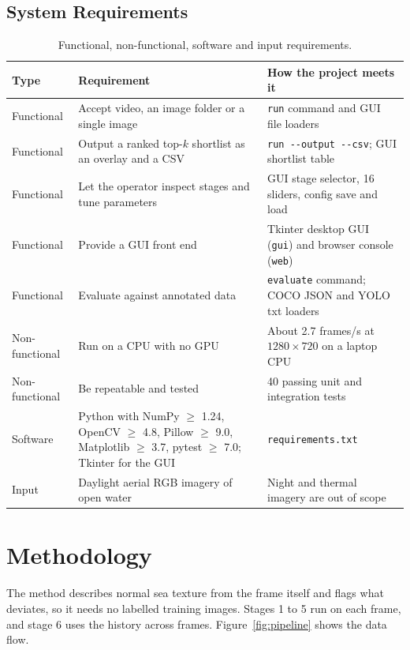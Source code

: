 \documentclass[11pt,a4paper]{article}
\begin{document}
\subsection{System Requirements}

\begin{table}[H]
\centering
\small
\caption{Functional, non-functional, software and input requirements.}
\label{tab:requirements}
\begin{tabularx}{\textwidth}{@{}lYY@{}}
\toprule
Type & Requirement & How the project meets it \\
\midrule
Functional & Accept video, an image folder or a single image & \texttt{run} command and GUI file loaders \\
Functional & Output a ranked top-$k$ shortlist as an overlay and a CSV & \texttt{run -{}-output -{}-csv}; GUI shortlist table \\
Functional & Let the operator inspect stages and tune parameters & GUI stage selector, 16 sliders, config save and load \\
Functional & Provide a GUI front end & Tkinter desktop GUI (\texttt{gui}) and browser console (\texttt{web}) \\
Functional & Evaluate against annotated data & \texttt{evaluate} command; COCO JSON and YOLO txt loaders \\
Non-functional & Run on a CPU with no GPU & About 2.7 frames/s at $1280 \times 720$ on a laptop CPU \\
Non-functional & Be repeatable and tested & 40 passing unit and integration tests \\
Software & Python with NumPy $\geq$ 1.24, OpenCV $\geq$ 4.8, Pillow $\geq$ 9.0, Matplotlib $\geq$ 3.7, pytest $\geq$ 7.0; Tkinter for the GUI & \texttt{requirements.txt} \\
Input & Daylight aerial RGB imagery of open water & Night and thermal imagery are out of scope \\
\bottomrule
\end{tabularx}
\end{table}

\section{Methodology}

The method describes normal sea texture from the frame itself and flags what deviates, so it needs no labelled training images. Stages 1 to 5 run on each frame, and stage 6 uses the history across frames. Figure~\ref{fig:pipeline} shows the data flow.
\end{document}
